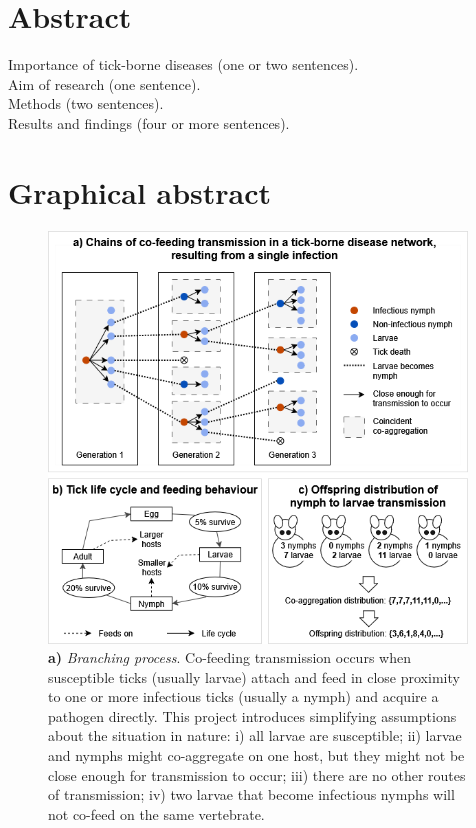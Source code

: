 \documentclass{article}
\begin{document}
\section*{Abstract}
Importance of tick-borne diseases (one or two sentences). \\
Aim of research (one sentence). \\
Methods (two sentences). \\
Results and findings (four or more sentences).

\newpage

\section*{Graphical abstract}

\begin{figure}[h!]
    \includegraphics[width=0.99\textwidth, center]{graphical_abstract_mk2.drawio}
    \caption{
    \textbf{a)} \textit{Branching process}. Co-feeding transmission  occurs when susceptible ticks (usually larvae) attach and feed in close proximity to one or more infectious ticks (usually a nymph) and acquire a pathogen directly. This project introduces simplifying assumptions about the situation in nature: i) all larvae are susceptible; ii) larvae and nymphs might co-aggregate on one host, but they might not be close enough for transmission to occur; iii) there are no other routes of transmission; iv) two larvae that become infectious nymphs will not co-feed on the same vertebrate. \\ 
}
\end{figure}
\end{document}
